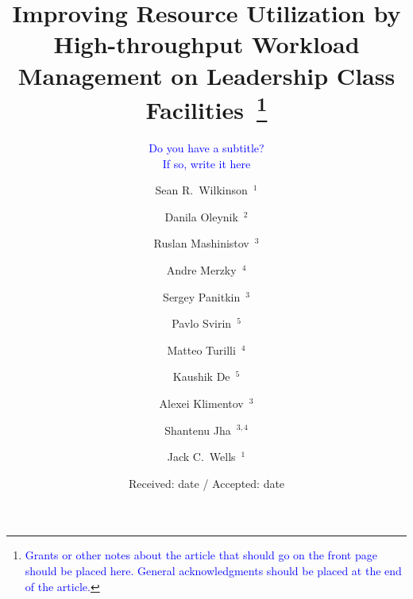 \documentclass[smallextended]{svjour3}      %
\begin{document}
\title{Improving Resource Utilization by High-throughput Workload Management
on Leadership Class Facilities~\thanks{\textcolor{blue}{%
Grants or other notes about the article that should go on the front page should
be placed here. General acknowledgments should be placed at the end of the
article.}}
}
\subtitle{\textcolor{blue}{Do you have a subtitle?\\ If so, write it here}}


\author{%
    Sean R.\ Wilkinson~$^1$ \and
    Danila Oleynik~$^2$ \and
    Ruslan Mashinistov~$^3$ \and
    Andre Merzky~$^4$ \and
    Sergey Panitkin~$^3$ \and
    Pavlo Svirin~$^5$ \and
    Matteo Turilli~$^4$ \and
    Kaushik De~$^5$ \and
    Alexei Klimentov~$^3$ \and
    Shantenu Jha~$^{3, 4}$ \and
    Jack C.\ Wells~$^1$
}



\date{Received: date / Accepted: date}

\maketitle
\end{document}
